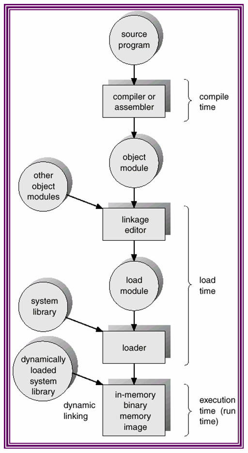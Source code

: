 \documentclass[CJKutf8,xcolor=pdftex,dvipsnames,table]{beamer}
\begin{document}
\begin{CJK*}{UTF8}{song}
\begin{frame}
\begin{minipage}[c]{0.4\textwidth}
    \includegraphics[scale=0.5]{v6f9-1}
  \end{minipage}
  \end{frame}
  

\end{CJK*}
\end{document}
